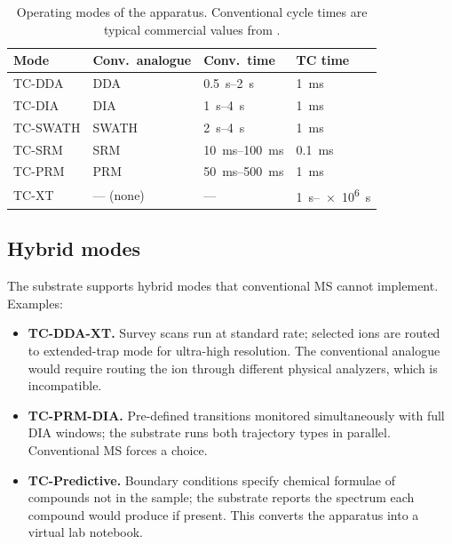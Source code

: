 \documentclass[twocolumn,11pt,a4paper]{article}
\theoremstyle{definition}
\theoremstyle{remark}
\begin{document}
\begin{table}[H]
\centering
\caption{Operating modes of the apparatus. Conventional cycle times are typical commercial values from \citep{gillet2012,lange2008,peterson2012,denisov2012}.}
\label{tab:modes}
\small
\begin{tabular}{llll}
\toprule
\textbf{Mode} & \textbf{Conv.\ analogue} & \textbf{Conv.\ time} & \textbf{TC time} \\
\midrule
TC-DDA & DDA & \SIrange{0.5}{2}{s} & \SI{1}{ms} \\
TC-DIA & DIA & \SIrange{1}{4}{s} & \SI{1}{ms} \\
TC-SWATH & SWATH & \SIrange{2}{4}{s} & \SI{1}{ms} \\
TC-SRM & SRM & \SIrange{10}{100}{ms} & \SI{0.1}{ms} \\
TC-PRM & PRM & \SIrange{50}{500}{ms} & \SI{1}{ms} \\
TC-XT & --- (none) & --- & \SIrange{1}{e6}{s} \\
\bottomrule
\end{tabular}
\end{table}

\subsection{Hybrid modes}

The substrate supports hybrid modes that conventional MS cannot implement. Examples:

\begin{itemize}[nosep]
    \item \textbf{TC-DDA-XT.} Survey scans run at standard rate; selected ions are routed to extended-trap mode for ultra-high resolution. The conventional analogue would require routing the ion through different physical analyzers, which is incompatible.
    \item \textbf{TC-PRM-DIA.} Pre-defined transitions monitored simultaneously with full DIA windows; the substrate runs both trajectory types in parallel. Conventional MS forces a choice.
    \item \textbf{TC-Predictive.} Boundary conditions specify chemical formulae of compounds not in the sample; the substrate reports the spectrum each compound would produce if present. This converts the apparatus into a virtual lab notebook.
\end{itemize}
\end{document}
